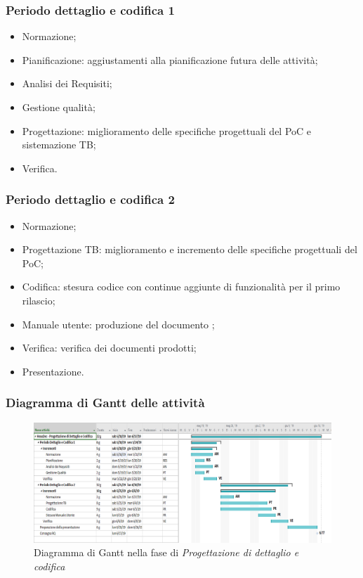         \subsubsection{Periodo dettaglio e codifica 1}
            \begin{itemize}
                \item Normazione;
                \item Pianificazione: aggiustamenti alla pianificazione futura delle attività;
                \item Analisi dei Requisiti;
                \item Gestione qualità;
                \item Progettazione: miglioramento delle specifiche progettuali del PoC e sistemazione TB;
                \item Verifica.
            \end{itemize}
        
        \subsubsection{Periodo dettaglio e codifica 2}
            \begin{itemize}
                \item Normazione;
                \item Progettazione TB: miglioramento e incremento delle specifiche progettuali del PoC;
                \item Codifica: stesura codice con continue aggiunte di funzionalità per il primo rilascio;
                \item Manuale utente: produzione del documento \docNameMU{};
                \item Verifica: verifica dei documenti prodotti;
                \item Presentazione.
            \end{itemize}

    \subsubsection{Diagramma di Gantt delle attività}
            \begin{figure}[H]
                \centering
                \includegraphics[width=\textwidth,height=\textheight,keepaspectratio]{immagini/gantt/GantRQ.png}
                \caption{Diagramma di Gantt nella fase di \textit{Progettazione di dettaglio e codifica}}
            \end{figure}

